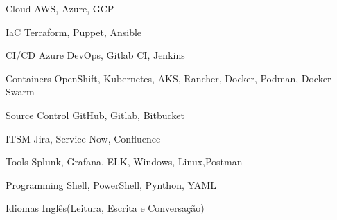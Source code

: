 

\begin{cvskills}

  \cvskill
    {Cloud} %
    {AWS, Azure, GCP} %

  \cvskill
    {IaC} %
    {Terraform, Puppet, Ansible} %

  \cvskill
    {CI/CD} %
    {Azure DevOps, Gitlab CI, Jenkins} %

  \cvskill
    {Containers} %
    {OpenShift, Kubernetes, AKS, Rancher, Docker, Podman, Docker Swarm} %

  \cvskill
    {Source Control} %
    {GitHub, Gitlab, Bitbucket} %

  \cvskill
    {ITSM} %
    {Jira, Service Now, Confluence} %

  \cvskill
    {Tools} %
    {Splunk, Grafana, ELK, Windows, Linux,Postman} %

  \cvskill
    {Programming} %
    {Shell, PowerShell, Pynthon, YAML} %

  \cvskill
    {Idiomas} %
    {Inglês(Leitura, Escrita e Conversação)} %

\end{cvskills}